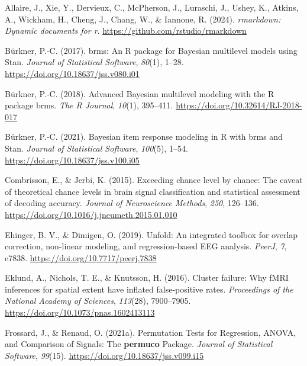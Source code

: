 \documentclass[
  doc,
  floatsintext,
  longtable,
  a4paper,
  nolmodern,
  notxfonts,
  notimes,
  colorlinks=true,linkcolor=blue,citecolor=blue,urlcolor=blue]{apa7}
\newlength{\cslhangindent}
\newenvironment{CSLReferences}[2] %
 {\begin{list}{}{%
  \setlength{\itemindent}{0pt}
  \setlength{\leftmargin}{0pt}
  \setlength{\parsep}{0pt}
  \ifodd #1
   \setlength{\leftmargin}{\cslhangindent}
   \setlength{\itemindent}{-1\cslhangindent}
  \fi
  \setlength{\itemsep}{#2\baselineskip}}}
 {\end{list}}
\begin{document}
\label{refs}
\begin{CSLReferences}{1}{0}
Allaire, J., Xie, Y., Dervieux, C., McPherson, J., Luraschi, J., Ushey,
K., Atkins, A., Wickham, H., Cheng, J., Chang, W., \& Iannone, R.
(2024). \emph{{rmarkdown}: Dynamic documents for r}.
\url{https://github.com/rstudio/rmarkdown}

Bürkner, P.-C. (2017). {brms}: An {R} package for {Bayesian} multilevel
models using {Stan}. \emph{Journal of Statistical Software},
\emph{80}(1), 1--28. \url{https://doi.org/10.18637/jss.v080.i01}

Bürkner, P.-C. (2018). Advanced {Bayesian} multilevel modeling with the
{R} package {brms}. \emph{The R Journal}, \emph{10}(1), 395--411.
\url{https://doi.org/10.32614/RJ-2018-017}

Bürkner, P.-C. (2021). Bayesian item response modeling in {R} with
{brms} and {Stan}. \emph{Journal of Statistical Software},
\emph{100}(5), 1--54. \url{https://doi.org/10.18637/jss.v100.i05}

Combrisson, E., \& Jerbi, K. (2015). Exceeding chance level by chance:
{The} caveat of theoretical chance levels in brain signal classification
and statistical assessment of decoding accuracy. \emph{Journal of
Neuroscience Methods}, \emph{250}, 126--136.
\url{https://doi.org/10.1016/j.jneumeth.2015.01.010}

Ehinger, B. V., \& Dimigen, O. (2019). Unfold: An integrated toolbox for
overlap correction, non-linear modeling, and regression-based {EEG}
analysis. \emph{PeerJ}, \emph{7}, e7838.
\url{https://doi.org/10.7717/peerj.7838}

Eklund, A., Nichols, T. E., \& Knutsson, H. (2016). Cluster failure: Why
fMRI inferences for spatial extent have inflated false-positive rates.
\emph{Proceedings of the National Academy of Sciences}, \emph{113}(28),
7900--7905. \url{https://doi.org/10.1073/pnas.1602413113}

Frossard, J., \& Renaud, O. (2021a). Permutation Tests for Regression,
ANOVA, and Comparison of Signals: The {\textbf{permuco}} Package.
\emph{Journal of Statistical Software}, \emph{99}(15).
\url{https://doi.org/10.18637/jss.v099.i15}


\end{CSLReferences}
\end{document}
